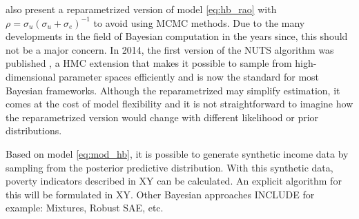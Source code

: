 \cite{molina_small_2014} also present a reparametrized version of model \ref{eq:hb_rao} with $\rho = \sigma_u(\sigma_u + \sigma_e)^{-1} $ to avoid using MCMC methods.
Due to the many developments in the field of Bayesian computation in the years since, this should not be a major concern.
In 2014, the first version of the NUTS algorithm was published \citep{hoffman_no-u-turn_2014}, a HMC extension that makes it possible to sample from high-dimensional parameter spaces efficiently and is now the standard for most Bayesian frameworks.
Although the reparametrized may simplify estimation, it comes at the cost of model flexibility and it is not straightforward to imagine how the reparametrized version would change with different likelihood or prior distributions.

Based on model \ref{eq:mod_hb}, it is possible to generate synthetic income data by sampling from the posterior predictive distribution.
With this synthetic data, poverty indicators described in XY can be calculated.
An explicit algorithm for this will be formulated in XY.
Other Bayesian approaches INCLUDE for example: Mixtures, Robust SAE, etc.